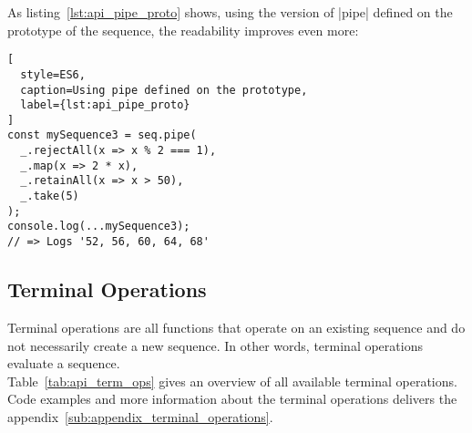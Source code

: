 As listing~\ref{lst:api_pipe_proto} shows, using the version of |pipe| defined
on the prototype of the sequence, the readability improves even more:
\begin{lstlisting}[
  style=ES6,
  caption=Using pipe defined on the prototype,
  label={lst:api_pipe_proto}
]
const mySequence3 = seq.pipe(
  _.rejectAll(x => x % 2 === 1),
  _.map(x => 2 * x),
  _.retainAll(x => x > 50),
  _.take(5)
);
console.log(...mySequence3);
// => Logs '52, 56, 60, 64, 68'
\end{lstlisting}


\subsection{Terminal Operations} %
\label{sub:api_Terminal Operations}
Terminal operations are all functions that operate on an existing sequence
and do not necessarily create a new sequence. In other words, terminal
operations evaluate a sequence.\\ 
Table~\ref{tab:api_term_ops} gives an overview of all available terminal
operations.\\
Code examples and more information about the terminal operations delivers the
appendix~\ref{sub:appendix_terminal_operations}.

